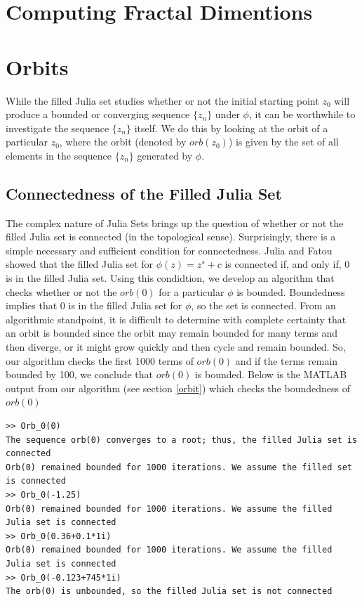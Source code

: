 \documentclass[12pt]{article}
\begin{document}
\section{Computing Fractal Dimentions}

\section{Orbits}

While the filled Julia set studies whether or not the initial starting point $z_0$ will produce a bounded or converging sequence $\{z_n\}$ under $\phi$, it can be worthwhile to investigate the sequence $\{z_n\}$ itself. We do this by looking at the orbit of a particular $z_0$, where the orbit (denoted by $orb(z_0)$) is given by the set of all elements in the sequence $\{z_n\}$ generated by $\phi$. 
	
\subsection{Connectedness of the Filled Julia Set}
The complex nature of Julia Sets brings up the question of whether or not the filled Julia set is connected (in the topological sense). Surprisingly, there is a simple necessary and sufficient condition for connectedness. Julia and Fatou showed that the filled Julia set for $\phi(z)=z^s+c$ is connected if, and only if, $0$ is in the filled Julia set. Using this condidtion, we develop an algorithm that checks whether or not the $orb(0)$ for a particular $\phi$ is bounded. Boundedness implies that $0$ is in the filled Julia set for $\phi$, so the set is connected. From an algorithmic standpoint, it is difficult to determine with complete certainty that an orbit is bounded since the orbit may remain bounded for many terms and then diverge, or it might grow quickly and then cycle and remain bounded. So, our algorithm checks the first 1000 terms of $orb(0)$ and if the terms remain bounded by 100, we conclude that $orb(0)$ is bounded. Below is the MATLAB output from our algorithm (see section \ref{orbit}) which checks the boundedness of $orb(0)$
\begin{verbatim}
>> Orb_0(0)
The sequence orb(0) converges to a root; thus, the filled Julia set is connected 
Orb(0) remained bounded for 1000 iterations. We assume the filled set is connected 
>> Orb_0(-1.25)
Orb(0) remained bounded for 1000 iterations. We assume the filled Julia set is connected 
>> Orb_0(0.36+0.1*1i)
Orb(0) remained bounded for 1000 iterations. We assume the filled Julia set is connected 
>> Orb_0(-0.123+745*1i)
The orb(0) is unbounded, so the filled Julia set is not connected 
\end{verbatim}
   
\end{document}
